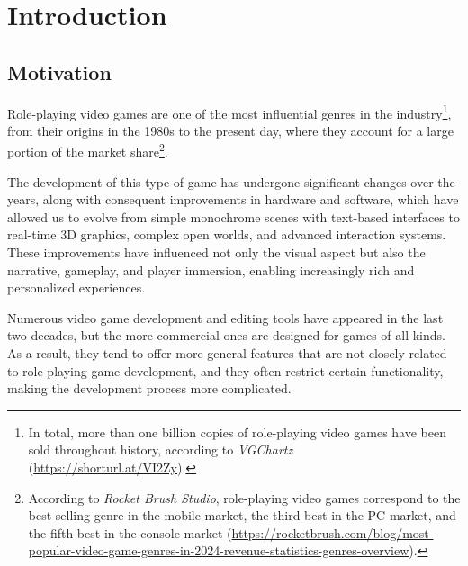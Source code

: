 \chapter*{Introduction}
\label{cap:introduction}



\section*{Motivation}
Role-playing video games are one of the most influential genres in the industry\footnote{In total, more than one billion copies of role-playing video games have been sold throughout history, according to \textit{VGChartz} (\url{https://shorturl.at/VI2Zy}).}, from their origins in the 1980s to the present day, where they account for a large portion of the market share\footnote{According to \textit{Rocket Brush Studio}, role-playing video games correspond to the best-selling genre in the mobile market, the third-best in the PC market, and the fifth-best in the console market (\url{https://rocketbrush.com/blog/most-popular-video-game-genres-in-2024-revenue-statistics-genres-overview}).}.

\smallskip

The development of this type of game has undergone significant changes over the years, along with consequent improvements in hardware and software, which have allowed us to evolve from simple monochrome scenes with text-based interfaces to real-time 3D graphics, complex open worlds, and advanced interaction systems. These improvements have influenced not only the visual aspect but also the narrative, gameplay, and player immersion, enabling increasingly rich and personalized experiences.

\medskip

Numerous video game development and editing tools have appeared in the last two decades, but the more commercial ones are designed for games of all kinds. As a result, they tend to offer more general features that are not closely related to role-playing game development, and they often restrict certain functionality, making the development process more complicated.

\smallskip

